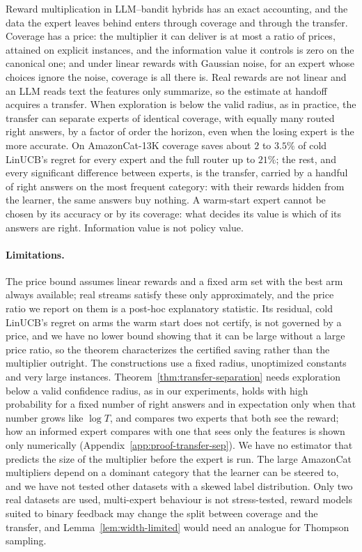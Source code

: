 \documentclass{article}
\theoremstyle{definition}
\theoremstyle{remark}
\theoremstyle{remark}
\begin{document}
Reward multiplication in LLM--bandit hybrids has an exact accounting, and the
data the expert leaves behind enters through coverage and through the
transfer. Coverage has a price: the multiplier it can deliver is at most a
ratio of prices, attained on explicit instances, and the information value
it controls is zero on the canonical one; and under linear rewards with
Gaussian noise, for an expert whose choices ignore the noise, coverage is all
there is. Real rewards are not linear and an LLM reads
text the features only summarize, so the estimate at handoff acquires a
transfer. When exploration is below the valid radius, as in practice, the
transfer can separate experts of identical coverage, with equally many routed
right answers, by a factor of order the horizon, even when the losing expert
is the more accurate. On AmazonCat-13K coverage saves about $2$ to $3.5\%$ of
cold LinUCB's regret for every expert and the full router up to $21\%$; the
rest, and every significant difference between experts, is the transfer,
carried by a handful of right answers on the most frequent category: with
their rewards hidden from the learner, the same answers buy nothing. A
warm-start expert cannot be chosen by its accuracy or by its coverage: what
decides its value is which of its answers are right. Information value is
not policy value.

\paragraph{Limitations.}
The price bound assumes linear rewards and a fixed arm set with the best arm
always available; real streams satisfy these only approximately, and the
price ratio we report on them is a post-hoc explanatory statistic. Its
residual, cold LinUCB's regret on arms the warm start does not certify, is
not governed by a price, and we have no lower bound showing that it can be
large without a large price ratio, so the theorem characterizes the
certified saving rather than the multiplier outright. The constructions use a
fixed radius, unoptimized constants and very large instances.
Theorem~\ref{thm:transfer-separation} needs exploration below a valid
confidence radius, as in our experiments, holds with high probability for a
fixed number of right answers and in expectation only when that number grows
like $\log T$, and compares two experts that both see the reward; how an informed expert
compares with one that sees only the features is shown only numerically
(Appendix~\ref{app:proof-transfer-sep}). We have no estimator that predicts
the size of the multiplier before the expert is run. The large AmazonCat
multipliers depend on a dominant category that the learner can be steered
to, and we have not tested other datasets with a skewed label distribution.
Only two real datasets are used, multi-expert behaviour is not stress-tested,
reward models suited to binary feedback may change the split between
coverage and the transfer, and Lemma~\ref{lem:width-limited} would need an
analogue for Thompson sampling.
\end{document}
